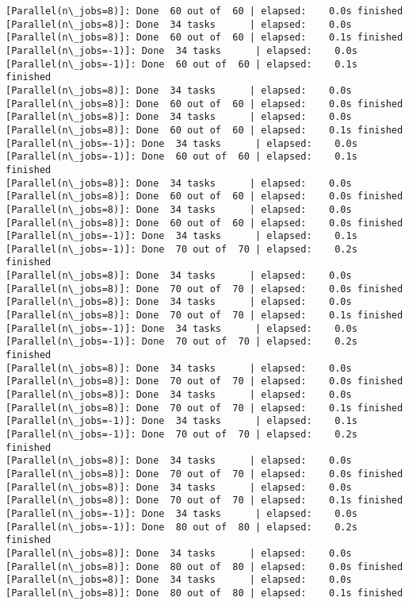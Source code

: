 \documentclass[11pt]{article}
\begin{document}
\begin{Verbatim}[commandchars=\\\{\}]
[Parallel(n\_jobs=8)]: Done  60 out of  60 | elapsed:    0.0s finished
[Parallel(n\_jobs=8)]: Done  34 tasks      | elapsed:    0.0s
[Parallel(n\_jobs=8)]: Done  60 out of  60 | elapsed:    0.1s finished
[Parallel(n\_jobs=-1)]: Done  34 tasks      | elapsed:    0.0s
[Parallel(n\_jobs=-1)]: Done  60 out of  60 | elapsed:    0.1s finished
[Parallel(n\_jobs=8)]: Done  34 tasks      | elapsed:    0.0s
[Parallel(n\_jobs=8)]: Done  60 out of  60 | elapsed:    0.0s finished
[Parallel(n\_jobs=8)]: Done  34 tasks      | elapsed:    0.0s
[Parallel(n\_jobs=8)]: Done  60 out of  60 | elapsed:    0.1s finished
[Parallel(n\_jobs=-1)]: Done  34 tasks      | elapsed:    0.0s
[Parallel(n\_jobs=-1)]: Done  60 out of  60 | elapsed:    0.1s finished
[Parallel(n\_jobs=8)]: Done  34 tasks      | elapsed:    0.0s
[Parallel(n\_jobs=8)]: Done  60 out of  60 | elapsed:    0.0s finished
[Parallel(n\_jobs=8)]: Done  34 tasks      | elapsed:    0.0s
[Parallel(n\_jobs=8)]: Done  60 out of  60 | elapsed:    0.0s finished
[Parallel(n\_jobs=-1)]: Done  34 tasks      | elapsed:    0.1s
[Parallel(n\_jobs=-1)]: Done  70 out of  70 | elapsed:    0.2s finished
[Parallel(n\_jobs=8)]: Done  34 tasks      | elapsed:    0.0s
[Parallel(n\_jobs=8)]: Done  70 out of  70 | elapsed:    0.0s finished
[Parallel(n\_jobs=8)]: Done  34 tasks      | elapsed:    0.0s
[Parallel(n\_jobs=8)]: Done  70 out of  70 | elapsed:    0.1s finished
[Parallel(n\_jobs=-1)]: Done  34 tasks      | elapsed:    0.0s
[Parallel(n\_jobs=-1)]: Done  70 out of  70 | elapsed:    0.2s finished
[Parallel(n\_jobs=8)]: Done  34 tasks      | elapsed:    0.0s
[Parallel(n\_jobs=8)]: Done  70 out of  70 | elapsed:    0.0s finished
[Parallel(n\_jobs=8)]: Done  34 tasks      | elapsed:    0.0s
[Parallel(n\_jobs=8)]: Done  70 out of  70 | elapsed:    0.1s finished
[Parallel(n\_jobs=-1)]: Done  34 tasks      | elapsed:    0.1s
[Parallel(n\_jobs=-1)]: Done  70 out of  70 | elapsed:    0.2s finished
[Parallel(n\_jobs=8)]: Done  34 tasks      | elapsed:    0.0s
[Parallel(n\_jobs=8)]: Done  70 out of  70 | elapsed:    0.0s finished
[Parallel(n\_jobs=8)]: Done  34 tasks      | elapsed:    0.0s
[Parallel(n\_jobs=8)]: Done  70 out of  70 | elapsed:    0.1s finished
[Parallel(n\_jobs=-1)]: Done  34 tasks      | elapsed:    0.0s
[Parallel(n\_jobs=-1)]: Done  80 out of  80 | elapsed:    0.2s finished
[Parallel(n\_jobs=8)]: Done  34 tasks      | elapsed:    0.0s
[Parallel(n\_jobs=8)]: Done  80 out of  80 | elapsed:    0.0s finished
[Parallel(n\_jobs=8)]: Done  34 tasks      | elapsed:    0.0s
[Parallel(n\_jobs=8)]: Done  80 out of  80 | elapsed:    0.1s finished

\end{Verbatim}
\end{document}
